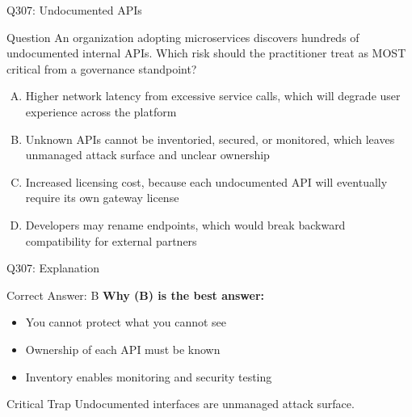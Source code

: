 \documentclass{beamer}
\begin{document}
	\begin{frame}{Q307: Undocumented APIs}
		\begin{block}{Question}
			\small An organization adopting microservices discovers hundreds of undocumented internal APIs. Which risk should the practitioner treat as MOST critical from a governance standpoint?
		\end{block}
		\begin{enumerate}[(A)]
			\footnotesize
			\item Higher network latency from excessive service calls, which will degrade user experience across the platform
			\item Unknown APIs cannot be inventoried, secured, or monitored, which leaves unmanaged attack surface and unclear ownership
			\item Increased licensing cost, because each undocumented API will eventually require its own gateway license
			\item Developers may rename endpoints, which would break backward compatibility for external partners
		\end{enumerate}
	\end{frame}
	
	\begin{frame}{Q307: Explanation}
		\begin{block}{Correct Answer: B}
			\textbf{Why (B) is the best answer:}
			\begin{itemize}
				\item You cannot protect what you cannot see
				\item Ownership of each API must be known
				\item Inventory enables monitoring and security testing
			\end{itemize}
		\end{block}
		\begin{alertblock}{Critical Trap}
			Undocumented interfaces are unmanaged attack surface.
		\end{alertblock}
	\end{frame}
	
\end{document}
